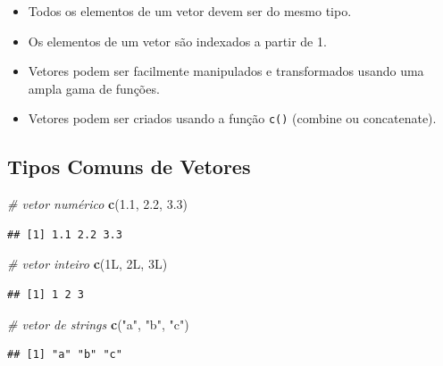 \documentclass[
]{book}
\newenvironment{Shaded}{\begin{snugshade}}{\end{snugshade}}
\newcommand{\CommentTok}[1]{\textcolor[rgb]{0.56,0.35,0.01}{\textit{#1}}}
\newcommand{\DataTypeTok}[1]{\textcolor[rgb]{0.13,0.29,0.53}{#1}}
\newcommand{\DecValTok}[1]{\textcolor[rgb]{0.00,0.00,0.81}{#1}}
\newcommand{\FloatTok}[1]{\textcolor[rgb]{0.00,0.00,0.81}{#1}}
\newcommand{\FunctionTok}[1]{\textcolor[rgb]{0.13,0.29,0.53}{\textbf{#1}}}
\newcommand{\NormalTok}[1]{#1}
\newcommand{\StringTok}[1]{\textcolor[rgb]{0.31,0.60,0.02}{#1}}
\theoremstyle{definition}
\theoremstyle{definition}
\theoremstyle{definition}
\theoremstyle{definition}
\theoremstyle{remark}
\begin{document}
\begin{itemize}
\item
  Todos os elementos de um vetor devem ser do mesmo tipo.
\item
  Os elementos de um vetor são indexados a partir de 1.
\item
  Vetores podem ser facilmente manipulados e transformados usando uma ampla gama de funções.
\item
  Vetores podem ser criados usando a função \texttt{c()} (combine ou concatenate).
\end{itemize}

\subsection{Tipos Comuns de Vetores}\label{tipos-comuns-de-vetores}

\begin{Shaded}
\begin{Highlighting}[]
\CommentTok{\# vetor numérico}
\FunctionTok{c}\NormalTok{(}\FloatTok{1.1}\NormalTok{, }\FloatTok{2.2}\NormalTok{, }\FloatTok{3.3}\NormalTok{)}
\end{Highlighting}
\end{Shaded}

\begin{verbatim}
## [1] 1.1 2.2 3.3
\end{verbatim}

\begin{Shaded}
\begin{Highlighting}[]
\CommentTok{\# vetor inteiro}
\FunctionTok{c}\NormalTok{(}\DecValTok{1}\DataTypeTok{L}\NormalTok{, }\DecValTok{2}\DataTypeTok{L}\NormalTok{, }\DecValTok{3}\DataTypeTok{L}\NormalTok{) }
\end{Highlighting}
\end{Shaded}

\begin{verbatim}
## [1] 1 2 3
\end{verbatim}

\begin{Shaded}
\begin{Highlighting}[]
\CommentTok{\# vetor de strings}
\FunctionTok{c}\NormalTok{(}\StringTok{"a"}\NormalTok{, }\StringTok{"b"}\NormalTok{, }\StringTok{"c"}\NormalTok{) }
\end{Highlighting}
\end{Shaded}

\begin{verbatim}
## [1] "a" "b" "c"
\end{verbatim}
\end{document}
